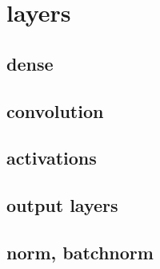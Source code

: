\section{layers}
\subsection{dense}
\subsection{convolution}
\subsection{activations}
\subsection{output layers}
\subsection{norm, batchnorm}
